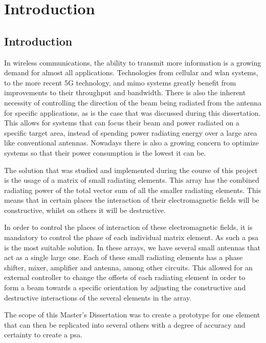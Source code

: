 \chapter{Introduction}
\label{chapter:introduction}


\section{Introduction}
\label{section:ch1_introduction}
\par In wireless communications, the ability to transmit more information is a growing demand for almost all applications. Technologies from cellular and \ac{wlan} systems, to the more recent 5G technology, and \ac{mimo} systems greatly benefit from improvements to their throughput and bandwidth. There is also the inherent necessity of controlling the direction of the beam being radiated from the antenna for specific applications, as is the case that was discussed during this dissertation. This allows for systems that can focus their beam and power radiated on a specific target area, instead of spending power radiating energy over a large area like conventional antennas. Nowadays there is also a growing concern to optimize systems so that their power consumption is the lowest it can be.

\par The solution that was studied and implemented during the course of this project is the usage of a matrix of small radiating elements. This array has the combined radiating power of the total vector sum of all the smaller radiating elements. This means that in certain places the interaction of their electromagnetic fields will be constructive, whilst on others it will be destructive.

\par In order to control the places of interaction of these electromagnetic fields, it is mandatory to control the phase of each individual matrix element. As such a \ac{psa} is the most suitable solution. In these arrays, we have several small antennas that act as a single large one. Each of these small radiating elements has a phase shifter, mixer, amplifier and antenna, among other circuits. This allowed for an external controller to change the offsets of each radiating element in order to form a beam towards a specific orientation by adjusting the constructive and destructive interactions of the several elements in the array.

\par The scope of this Master's Dissertation was to create a prototype for one element that can then be replicated into several others with a degree of accuracy and certainty to create a \ac{psa}.


